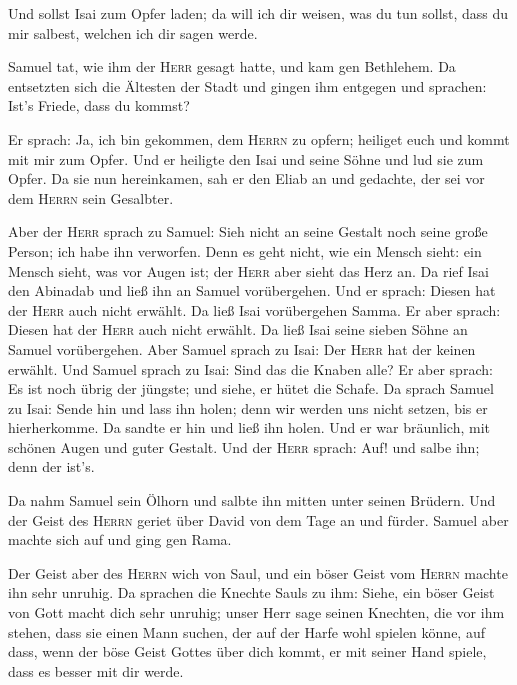  Und sollst Isai zum Opfer laden; da will ich dir weisen,
was du tun sollst, dass du mir salbest, welchen ich dir sagen werde.

 Samuel tat, wie ihm der \textsc{Herr} gesagt hatte, und
kam gen Bethlehem. Da entsetzten sich die Ältesten der Stadt und gingen
ihm entgegen und sprachen: Ist's Friede, dass du kommst?

 Er sprach: Ja, ich bin gekommen, dem \textsc{Herrn} zu
opfern; heiliget euch und kommt mit mir zum Opfer. Und er heiligte den
Isai und seine Söhne und lud sie zum Opfer.  Da sie nun
hereinkamen, sah er den Eliab an und gedachte, der sei vor dem
\textsc{Herrn} sein Gesalbter.

 Aber der \textsc{Herr} sprach zu Samuel: Sieh nicht an
seine Gestalt noch seine große Person; ich habe ihn verworfen. Denn es
geht nicht, wie ein Mensch sieht: ein Mensch sieht, was vor Augen ist;
der \textsc{Herr} aber sieht das Herz an.  Da rief Isai
den Abinadab und ließ ihn an Samuel vorübergehen. Und er sprach: Diesen
hat der \textsc{Herr} auch nicht erwählt.  Da ließ Isai
vorübergehen Samma. Er aber sprach: Diesen hat der \textsc{Herr} auch
nicht erwählt.  Da ließ Isai seine sieben Söhne an Samuel
vorübergehen. Aber Samuel sprach zu Isai: Der \textsc{Herr} hat der
keinen erwählt.  Und Samuel sprach zu Isai: Sind das die
Knaben alle? Er aber sprach: Es ist noch übrig der jüngste; und siehe,
er hütet die Schafe. Da sprach Samuel zu Isai: Sende hin und lass ihn
holen; denn wir werden uns nicht setzen, bis er hierherkomme.
 Da sandte er hin und ließ ihn holen. Und er war
bräunlich, mit schönen Augen und guter Gestalt. Und der \textsc{Herr}
sprach: Auf! und salbe ihn; denn der ist's.

 Da nahm Samuel sein Ölhorn und salbte ihn mitten unter
seinen Brüdern. Und der Geist des \textsc{Herrn} geriet über David von
dem Tage an und fürder. Samuel aber machte sich auf und ging gen Rama.

 Der Geist aber des \textsc{Herrn} wich von Saul, und ein
böser Geist vom \textsc{Herrn} machte ihn sehr unruhig. 
Da sprachen die Knechte Sauls zu ihm: Siehe, ein böser Geist von Gott
macht dich sehr unruhig;  unser Herr sage seinen
Knechten, die vor ihm stehen, dass sie einen Mann suchen, der auf der
Harfe wohl spielen könne, auf dass, wenn der böse Geist Gottes über dich
kommt, er mit seiner Hand spiele, dass es besser mit dir werde.

